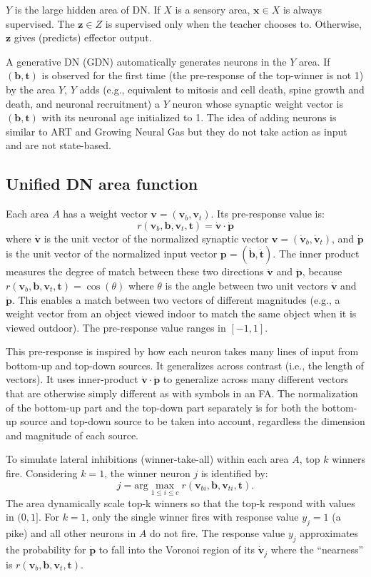 \documentclass[conference]{IEEEtran}
\def\b{\mathbf b}
\def\p{\mathbf p}
\def\t{\mathbf t}
\def\v{\mathbf v}
\def\x{\mathbf x}
\def\z{\mathbf z}
\begin{document}
$Y$ is the large hidden area of DN.  If $X$ is a sensory area, $\x \in X$ is always supervised.   
The $\z \in Z$ is supervised only when the 
teacher chooses to.   Otherwise, $\z$ gives (predicts) effector output.  

A generative DN (GDN) automatically generates neurons in the $Y$ area.  If $(\b, \t)$ is observed for the first time (the pre-response of the top-winner is not 1) by 
the area $Y$, $Y$ adds (e.g., equivalent to mitosis and cell death, spine growth and death, and neuronal recruitment) a $Y$ neuron whose synaptic weight vector is 
$(\b, \t)$ with its neuronal age initialized to 1.   The idea of adding neurons is similar to ART and Growing Neural Gas but they do not take action as input and are not state-based. 

\subsection{Unified DN area function}

Each area $A$ has a
weight vector $\v= (\v_b, \v_t)$.  Its pre-response value is:
\begin{equation}
\label{EQ:pre-response}
r (\v_b, \b, \v_t, \t)  
= \dot{\v} \cdot \dot{\p}
\end{equation}
where
$\dot{\v}$ is the unit vector of the normalized synaptic vector 
$\v= (\dot{\v}_b, \dot{\v}_t)$, and $\dot{\p}$ is the unit vector of the normalized input vector 
$\p= (\dot{\b}, \dot{\t})$.    The inner product measures the degree of match between these two directions 
$\dot{\v}$ and $\dot{\p}$, because $r (\v_b, \b, \v_t, \t) = \cos(\theta) $ where $\theta$ is the angle between 
two unit vectors $\dot{\v}$ and $\dot{\p}$.
This enables a match between two vectors of different magnitudes (e.g., a weight vector from an object viewed indoor to match the same object when it is viewed  outdoor). 
The pre-response value ranges in $[-1, 1]$.

This pre-response is inspired by how each neuron takes many lines of input from bottom-up and top-down sources.  It generalizes across contrast (i.e., the length of vectors).   It uses inner-product $\dot{\v} \cdot \dot{\p}$ to
generalize across many different vectors that are otherwise simply different as with symbols in an FA.  The normalization of the bottom-up part and the top-down part separately is for both the bottom-up source and top-down source
to be taken into account, regardless the dimension and magnitude of each source. 

To simulate lateral inhibitions (winner-take-all) within each area $A$, top $k$ winners fire.  Considering $k=1$, the winner neuron $j$ is identified by:
\begin{equation}
j = \mbox{arg}\max_{1\le i \le c}  r (\v_{bi}, \b, \v_{ti}, \t) .
\label{EQ:jmax}
\end{equation}
The area dynamically scale top-k winners  so that the top-k respond with values in $(0, 1]$.   
For $k=1$, only the single winner fires with response value 
$y_j=1$ (a pike) and all other neurons in $A$ do not fire.  The response value $y_j$ approximates the 
probability for $\dot{\p} $ to fall into the Voronoi region of its $\dot{\v}_j$ where the ``nearness'' 
is $r (\v_b, \b, \v_t, \t)$.   
\end{document}

